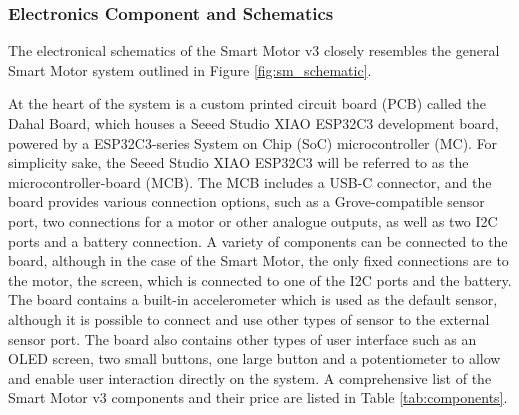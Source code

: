 \subsubsection{\label{sec:methods_sm_elec}Electronics Component and Schematics}
The electronical schematics of the Smart Motor v3 closely resembles the general Smart Motor system outlined in Figure \ref{fig:sm_schematic}. %


At the heart of the system is a custom printed circuit board (PCB) called the Dahal Board, which houses a Seeed Studio XIAO ESP32C3 development board, powered by a ESP32C3-series System on Chip (SoC) microcontroller (MC). For simplicity sake, the Seeed Studio XIAO ESP32C3 will be referred to as the microcontroller-board (MCB). The MCB includes a USB-C connector, and the board provides various connection options, such as a Grove-compatible sensor port, two connections for a motor or other analogue outputs, as well as two I2C ports and a battery connection. A variety of components can be connected to the board, although in the case of the Smart Motor, the only fixed connections are to the motor, the screen, which is connected to one of the I2C ports and the battery. The board contains a built-in accelerometer which is used as the default sensor, although it is possible to connect and use other types of sensor to the external sensor port. The board also contains other types of user interface such as an OLED screen, two small buttons, one large button and a potentiometer to allow and enable user interaction directly on the system. A comprehensive list of the Smart Motor v3 components and their price are listed in Table \ref{tab:components}.


